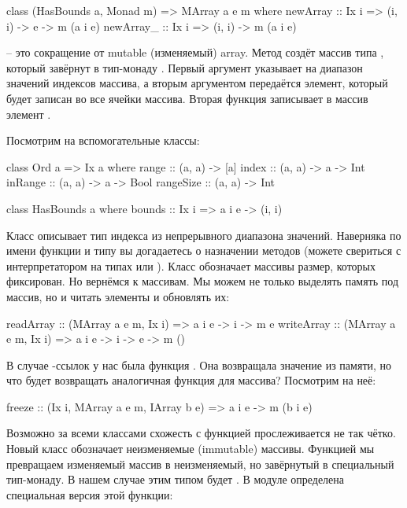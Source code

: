 \begin{code}
class (HasBounds a, Monad m) => MArray a e m where
    newArray  :: Ix i => (i, i) -> e -> m (a i e)
    newArray_ :: Ix i => (i, i) -> m (a i e)
\end{code}

 -- это сокращение от mutable (изменяемый)  array.
Метод  создёт массив типа , который
завёрнут в тип-монаду . Первый аргумент указывает
на диапазон значений индексов массива, а вторым аргументом
передаётся элемент, который будет записан во все ячейки массива.
Вторая функция записывает в массив элемент . 

Посмотрим на вспомогательные классы:

\begin{code}
class Ord a => Ix a where
    range :: (a, a) -> [a]
    index :: (a, a) -> a -> Int
    inRange :: (a, a) -> a -> Bool
    rangeSize :: (a, a) -> Int

class HasBounds a where
    bounds :: Ix i => a i e -> (i, i)
\end{code}

Класс  описывает тип индекса из непрерывного диапазона значений.
Наверняка по имени функции и типу вы догадаетесь о назначении
методов (можете свериться с интерпретатором на типах
 или ). Класс  
обозначает массивы размер, которых фиксирован.
Но вернёмся к массивам. Мы можем не только выделять память
под массив, но и читать элементы и обновлять их:

\begin{code}
readArray  :: (MArray a e m, Ix i) => a i e -> i -> m e
writeArray :: (MArray a e m, Ix i) => a i e -> i -> e -> m ()
\end{code}

В случае -ссылок у нас была функция .
Она возвращала значение из памяти, но что будет
возвращать аналогичная функция для массива?
Посмотрим на неё:

\begin{code}
freeze :: (Ix i, MArray a e m, IArray b e) => a i e -> m (b i e)
\end{code}

Возможно за всеми классами схожесть с функцией  
прослеживается не так чётко. Новый класс 
обозначает неизменяемые (immutable) массивы.
Функцией  мы превращаем изменяемый массив
в неизменяемый, но завёрнутый в специальный тип-монаду.
В нашем случае этим типом будет . В модуле 
 определена специальная версия этой функции:

